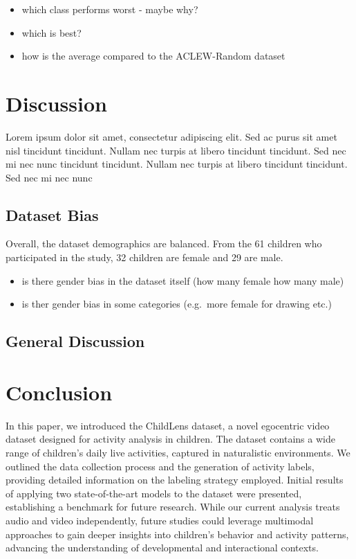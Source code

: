 \documentclass[
  man,floatsintext]{apa6}
\providecommand{\tightlist}{%
  \setlength{\itemsep}{0pt}\setlength{\parskip}{0pt}}
\begin{document}
\begin{itemize}
\tightlist
\item
  which class performs worst - maybe why?
\item
  which is best?
\item
  how is the average compared to the ACLEW-Random dataset
\end{itemize}

\section{Discussion}\label{discussion}

Lorem ipsum dolor sit amet, consectetur adipiscing elit. Sed ac purus sit amet nisl tincidunt tincidunt. Nullam nec turpis at libero tincidunt tincidunt. Sed nec mi nec nunc tincidunt tincidunt. Nullam nec turpis at libero tincidunt tincidunt. Sed nec mi nec nunc

\subsection{Dataset Bias}\label{dataset-bias}

Overall, the dataset demographics are balanced. From the 61 children who participated in the study, 32 children are female and 29 are male.

\begin{itemize}
\tightlist
\item
  is there gender bias in the dataset itself (how many female how many male)
\item
  is ther gender bias in some categories (e.g.~more female for drawing etc.)
\end{itemize}

\subsection{General Discussion}\label{general-discussion}

\section{Conclusion}\label{conclusion}

In this paper, we introduced the ChildLens dataset, a novel egocentric video dataset designed for activity analysis in children. The dataset contains a wide range of children's daily live activities, captured in naturalistic environments. We outlined the data collection process and the generation of activity labels, providing detailed information on the labeling strategy employed. Initial results of applying two state-of-the-art models to the dataset were presented, establishing a benchmark for future research. While our current analysis treats audio and video independently, future studies could leverage multimodal approaches to gain deeper insights into children's behavior and activity patterns, advancing the understanding of developmental and interactional contexts.
\end{document}
